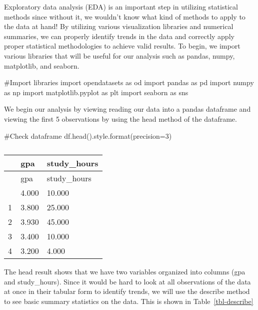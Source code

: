 \documentclass[
  letterpaper,
  DIV=11,
  numbers=noendperiod]{scrreprt}
\newenvironment{Shaded}{\begin{snugshade}}{\end{snugshade}}
\newcommand{\BuiltInTok}[1]{\textcolor[rgb]{0.00,0.23,0.31}{#1}}
\newcommand{\CommentTok}[1]{\textcolor[rgb]{0.37,0.37,0.37}{#1}}
\newcommand{\DecValTok}[1]{\textcolor[rgb]{0.68,0.00,0.00}{#1}}
\newcommand{\ImportTok}[1]{\textcolor[rgb]{0.00,0.46,0.62}{#1}}
\newcommand{\NormalTok}[1]{\textcolor[rgb]{0.00,0.23,0.31}{#1}}
\newcommand{\OperatorTok}[1]{\textcolor[rgb]{0.37,0.37,0.37}{#1}}
\begin{document}
Exploratory data analysis (EDA) is an important step in utilizing
statistical methods since without it, we wouldn't know what kind of
methods to apply to the data at hand! By utilizing various visualization
libraries and numerical summaries, we can properly identify trends in
the data and correctly apply proper statistical methodologies to achieve
valid results. To begin, we import various libraries that will be useful
for our analysis such as pandas, numpy, matplotlib, and seaborn.

\begin{Shaded}
\begin{Highlighting}[]
\CommentTok{\#Import libraries}
\ImportTok{import}\NormalTok{ opendatasets }\ImportTok{as}\NormalTok{ od}
\ImportTok{import}\NormalTok{ pandas }\ImportTok{as}\NormalTok{ pd}
\ImportTok{import}\NormalTok{ numpy }\ImportTok{as}\NormalTok{ np}
\ImportTok{import}\NormalTok{ matplotlib.pyplot }\ImportTok{as}\NormalTok{ plt}
\ImportTok{import}\NormalTok{ seaborn }\ImportTok{as}\NormalTok{ sns}
\end{Highlighting}
\end{Shaded}

We begin our analysis by viewing reading our data into a pandas
dataframe and viewing the first 5 observations by using the head method
of the dataframe.

\begin{Shaded}
\begin{Highlighting}[]
\CommentTok{\#Check dataframe}
\NormalTok{df.head().style.}\BuiltInTok{format}\NormalTok{(precision}\OperatorTok{=}\DecValTok{3}\NormalTok{)}
\end{Highlighting}
\end{Shaded}

\begin{longtable}[]{@{}lll@{}}
\caption{}\label{T_832fa}\tabularnewline
\toprule\noalign{}
~ & gpa & study\_hours \\
\midrule\noalign{}
\endfirsthead
\toprule\noalign{}
~ & gpa & study\_hours \\
\midrule\noalign{}
\endhead
\bottomrule\noalign{}
\endlastfoot
0 & 4.000 & 10.000 \\
1 & 3.800 & 25.000 \\
2 & 3.930 & 45.000 \\
3 & 3.400 & 10.000 \\
4 & 3.200 & 4.000 \\
\end{longtable}

The head result shows that we have two variables organized into columns
(gpa and study\_hours). Since it would be hard to look at all
observations of the data at once in their tabular form to identify
trends, we will use the describe method to see basic summary statistics
on the data. This is shown in Table~\ref{tbl-describe}
\end{document}
